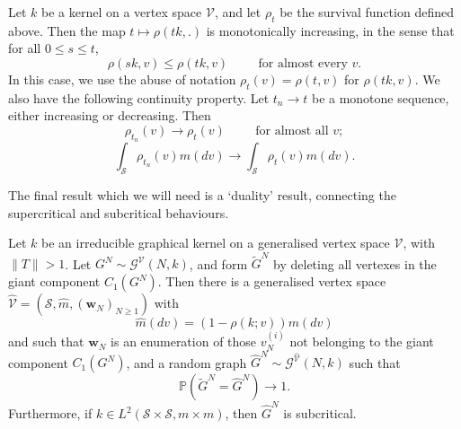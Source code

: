    \begin{theorem}\label{thrm: continuity of rho} Let $k$ be a kernel on a vertex space $\mathcal{V}$, and let $\rho_t$ be the survival function defined above. Then the map $t\mapsto \rho(tk, .)$ is monotonically increasing, in the sense that for all $0\leq s \leq t$, \begin{equation}
          \rho(sk, v) \leq \rho(tk, v) \hspace{1cm} \text{for almost every } v.
      \end{equation}In this case, we use the abuse of notation $\rho_t(v)=\rho(t,v)$ for $\rho(tk,v).$ We also have the following continuity property. Let $t_n\rightarrow t$ be a monotone sequence, either increasing or decreasing. Then \begin{equation}
       \rho_{t_n}(v)\rightarrow \rho_t(v) \hspace{1cm} \text{for almost all }v;
   \end{equation} \begin{equation}
       \int_{\mathcal{S}}\rho_{t_n}(v)m(dv)\rightarrow \int_{\mathcal{S}}\rho_t(v)m(dv).
   \end{equation} \end{theorem} The final result which we will need is a `duality' result, connecting the supercritical and subcritical behaviours.
   \begin{theorem}\label{thrm: coupling supercritical and subcritical} Let $k$ be an irreducible graphical kernel on a generalised vertex space $\mathcal{V}$, with $\|T\|>1$. Let $G^N \sim \mathcal{G}^\mathcal{V}(N, k)$, and form $\widetilde{G}^N$ by deleting all vertexes in the giant component $C_1(G^N).$ Then there is a generalised vertex space $\widehat{\mathcal{V}}=(\mathcal{S}, \widehat{m}, (\mathbf{w}_N)_{N\geq 1})$ with \begin{equation}
       \widehat{m}(dv)=(1-\rho(k;v))m(dv)
   \end{equation} and such that $\mathbf{w}_N$ is an enumeration of those $v^{(i)}_N$ not belonging to the giant component $C_1(G^N)$, and a random graph $\widehat{G}^N \sim \mathcal{G}^{\widehat{\mathcal{V}}}(N,k)$ such that \begin{equation}
       \mathbb{P}(\widetilde{G}^N=\widehat{G}^N)\rightarrow 1.
   \end{equation}  Furthermore, if $k\in L^2(\mathcal{S}\times \mathcal{S}, m\times m)$, then $\widehat{G}^N$ is subcritical.\end{theorem} 